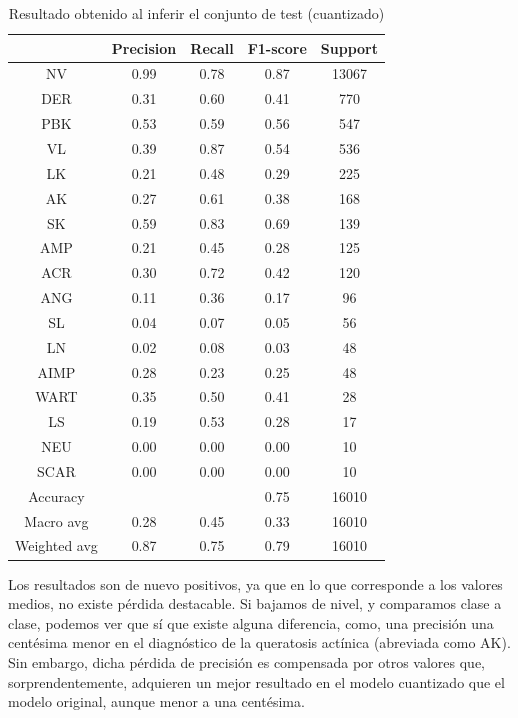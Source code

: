 \begin{table}[H]
	\centering
	\begin{tabular}{|c|c|c|c|c|}
		\hline
		~ & Precision & Recall & F1-score & Support \\ \hline
		NV & 0.99 & 0.78 & 0.87 & 13067 \\ \hline
		DER & 0.31 & 0.60 & 0.41 & 770 \\ \hline
		PBK & 0.53 & 0.59 & 0.56 & 547 \\ \hline
		VL & 0.39 & 0.87 & 0.54 & 536 \\ \hline
		LK & 0.21 & 0.48 & 0.29 & 225 \\ \hline
		AK & 0.27 & 0.61 & 0.38 & 168 \\ \hline
		SK & 0.59 & 0.83 & 0.69 & 139 \\ \hline
		AMP & 0.21 & 0.45 & 0.28 & 125 \\ \hline
		ACR & 0.30 & 0.72 & 0.42 & 120 \\ \hline
		ANG & 0.11 & 0.36 & 0.17 & 96 \\ \hline
		SL & 0.04 & 0.07 & 0.05 & 56 \\ \hline
		LN & 0.02 & 0.08 & 0.03 & 48 \\ \hline
		AIMP & 0.28 & 0.23 & 0.25 & 48 \\ \hline
		WART & 0.35 & 0.50 & 0.41 & 28 \\ \hline
		LS & 0.19 & 0.53 & 0.28 & 17 \\ \hline
		NEU & 0.00 & 0.00 & 0.00 & 10 \\ \hline
		SCAR & 0.00 & 0.00 & 0.00 & 10 \\ \hline
		Accuracy & ~ & ~ & 0.75 & 16010 \\ \hline
		Macro avg & 0.28 & 0.45 & 0.33 & 16010 \\ \hline
		Weighted avg & 0.87 & 0.75 & 0.79 & 16010 \\ \hline
	\end{tabular}
	\caption{Resultado obtenido al inferir el conjunto de test (cuantizado)}
	\label{tab:testbenquant}
\end{table}

Los resultados son de nuevo positivos, ya que en lo que corresponde a los valores medios, no existe pérdida destacable. Si bajamos de nivel, y comparamos clase a clase, podemos ver que sí que existe alguna diferencia, como, una precisión una centésima menor en el diagnóstico de la queratosis actínica (abreviada como AK). Sin embargo, dicha pérdida de precisión es compensada por otros valores que, sorprendentemente, adquieren un mejor resultado en el modelo cuantizado que el modelo original, aunque menor a una centésima.

